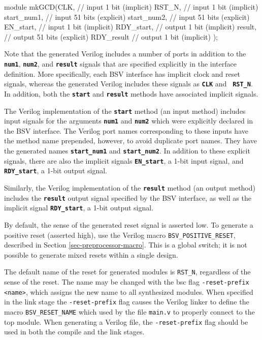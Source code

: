 \documentclass{article}
\newcommand{\te}[1]{\texttt{#1}}
\newenvironment{centerboxverbatim}
  {\center
   \boxedverbatim}
  {\endboxedverbatim
  {\endcenter }}
\begin{document}
\begin{centerboxverbatim}
module mkGCD(CLK,                 // input   1 bit  (implicit)
             RST_N,               // input   1 bit  (implicit)
             start_num1,          // input  51 bits (explicit)
             start_num2,          // input  51 bits (explicit)
             EN_start,            // input   1 bit  (implicit)
             RDY_start,           // output  1 bit  (implicit)
             result,              // output 51 bits (explicit)
             RDY_result           // output  1 bit  (implicit)
             );
\end{centerboxverbatim}

Note that the generated Verilog includes a number of ports in addition
to the {\bf\tt num1}, {\bf\tt num2}, and {\bf\tt result} signals that are
specified explicitly in the interface definition. More specifically,
each BSV interface has implicit clock and reset signals, whereas the
generated Verilog includes these signals as {\bf\tt CLK} and {\bf\tt
RST\_N}. In addition, both the {\bf\tt start} and {\bf\tt result} methods
have associated implicit signals.

The Verilog implementation of the {\bf\tt start} method (an
input method) includes input signals for the arguments {\bf\tt num1}
and {\bf\tt num2} which were explicitly declared in the BSV interface.
The Verilog port names corresponding to these inputs have the method
name prepended, however, to avoid duplicate port names.  They have
the generated names {\bf\tt start\_num1} and {\bf\tt start\_num2}.
In addition to these explicit signals, there are also the implicit
signals {\bf\tt EN\_start}, a 1-bit input signal, and {\bf\tt RDY\_start}, a
1-bit output signal.

Similarly, the Verilog implementation of the {\bf\tt result} method
(an output method) includes the {\bf\tt result} output signal specified by
the BSV interface, as well as the implicit signal {\bf\tt RDY\_start},
a 1-bit output signal.


By default, the sense of the generated reset signal is asserted low.
To generate a positive reset (asserted high), use the Verilog macro
\te{BSV\_POSITIVE\_RESET}, described in Section
\ref{sec-preprocessor-macro}.  This is a global switch; it is not
possible to generate mixed resets within a single design.

The default name of the reset for generated modules is \te{RST\_N}, regardless
of the sense of the reset.  The name may be changed with the bsc flag
\te{-reset-prefix <name>}, which assigns the new name to all
synthesized modules.  When specified in the link stage the
 \te{-reset-prefix} flag causes the Verilog
 linker to define  the macro
 \te{BSV\_RESET\_NAME} which
 used by the file \te{main.v} to properly connect to the top module.
 When generating a Verilog file, the \te{-reset-prefix} 
flag should be used in both the compile and the link stages.  
\end{document}
